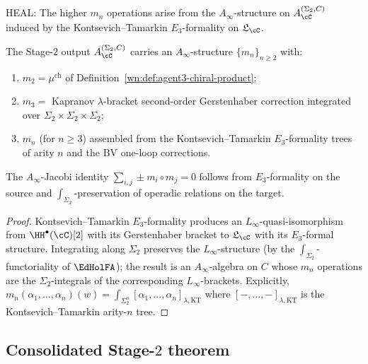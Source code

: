 HEAL: The higher $m_n$ operations arise from the $A_\infty$-structure on $A^{(\Sigma_2,C)}_\cC$ induced by the Kontsevich--Tamarkin $E_3$-formality on $\mathfrak{L}_\cC$.

\begin{proposition}
\label{wn:prop:agent3-higher-Ainf}
\ClaimStatusProvedHere
The Stage-$2$ output $A^{(\Sigma_2,C)}_\cC$ carries an $A_\infty$-structure $\{m_n\}_{n\geq 2}$ with:
\begin{enumerate}[label=\textup{(\roman*)}]
 \item $m_2=\mu^{\mathrm{ch}}$ of Definition~\ref{wn:def:agent3-chiral-product};
 \item $m_3=$ Kapranov $\lambda$-bracket second-order Gerstenhaber correction integrated over $\Sigma_2\times\Sigma_2\times\Sigma_2$;
 \item $m_n$ (for $n\geq 3$) assembled from the Kontsevich--Tamarkin $E_3$-formality trees of arity $n$ and the BV one-loop corrections.
\end{enumerate}
The $A_\infty$-Jacobi identity $\sum_{i,j}\pm m_i\circ m_j=0$ follows from $E_3$-formality on the source and $\int_{\Sigma_2}$-preservation of operadic relations on the target.
\end{proposition}

\begin{proof}
Kontsevich--Tamarkin $E_3$-formality produces an $L_\infty$-quasi-isomorphism from $\HH^\bullet(\cC)[2]$ with its Gerstenhaber bracket to $\mathfrak{L}_\cC$ with its $E_3$-formal structure. Integrating along $\Sigma_2$ preserves the $L_\infty$-structure (by the $\int_{\Sigma_2}$-functoriality of $\EdHolFA$); the result is an $A_\infty$-algebra on $C$ whose $m_n$ operations are the $\Sigma_2$-integrals of the corresponding $L_\infty$-brackets. Explicitly, $m_n(\alpha_1,\ldots,\alpha_n)(w)=\int_{\Sigma_2^n}[\alpha_1,\ldots,\alpha_n]_{\lambda,\mathrm{KT}}$ where $[-,\ldots,-]_{\lambda,\mathrm{KT}}$ is the Kontsevich--Tamarkin arity-$n$ tree.
\end{proof}

\subsection{Consolidated Stage-$2$ theorem}
\label{wn:subsec:agent3-consolidated}

